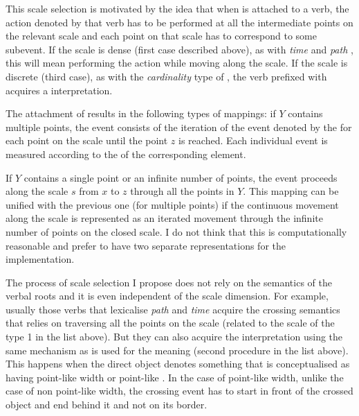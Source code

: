This scale selection is motivated by the idea that when  is attached to a verb, the action denoted by that verb has to be performed at all the intermediate points on the relevant scale and each point on that scale has to correspond to some subevent. If the scale is dense (first case described above), as with \textit{time} and \textit{path} , this will mean performing the action while moving along the scale. If the scale is discrete (third case), as with the \textit{cardinality} type of , the verb prefixed with  acquires a  interpretation. 

The attachment of  results in the following types of mappings: %
if $Y$ contains multiple points, the event consists of the iteration of the event denoted by the  for each point on the scale until the point $z$ is reached. Each individual event is measured according to the  of the corresponding element.

If $Y$ contains a single point or an infinite number of points, the event proceeds along the scale $s$ from $x$ to $z$ through all the points in $Y$. This mapping can be unified with the previous one (for multiple points) if the continuous movement along the scale is represented as an iterated movement through the infinite number of points on the closed scale. I do not think that this is computationally reasonable and prefer to have two separate representations for the implementation.

The process of scale selection I propose does not rely on the semantics of the verbal roots and it is even independent of the scale dimension. For example, usually those verbs that lexicalise \textit{path} and \textit{time}  acquire the crossing semantics that relies on traversing all the points on the scale (related to the scale of the type 1 in the list above). But they can also acquire the interpretation using the same mechanism as is used for the  meaning (second procedure in the list above). This happens when the direct object denotes something that is conceptualised as having point-like width or point-like . In the case of point-like width, unlike the case of non point-like width, the crossing event has to start in front of the crossed object and end behind it and not on its border.

